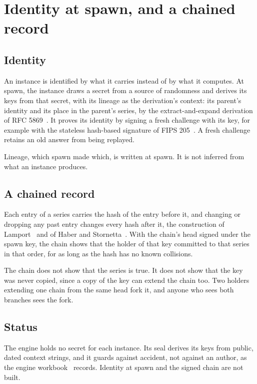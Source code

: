 \chapter{\texorpdfstring{Identity at spawn, and a chained record}{Identity at spawn, and a chained record}}
\label{chap:identity}

\section{\texorpdfstring{Identity}{Identity}}

An instance is identified by what it carries instead of by what it computes. At spawn, the instance draws a secret from a source of randomness and derives its keys from that secret, with its lineage as the derivation's context: its parent's identity and its place in the parent's series, by the extract-and-expand derivation of RFC 5869~\cite{src:RFC5869}. It proves its identity by signing a fresh challenge with its key, for example with the stateless hash-based signature of FIPS 205~\cite{src:FIPS-205}. A fresh challenge retains an old answer from being replayed.

Lineage, which spawn made which, is written at spawn. It is not inferred from what an instance produces.

\section{\texorpdfstring{A chained record}{A chained record}}

Each entry of a series carries the hash of the entry before it, and changing or dropping any past entry changes every hash after it, the construction of Lamport~\cite{src:Lamport-1981} and of Haber and Stornetta~\cite{src:Haber-Stornetta-1991}. With the chain's head signed under the spawn key, the chain shows that the holder of that key committed to that series in that order, for as long as the hash has no known collisions.

The chain does not show that the series is true. It does not show that the key was never copied, since a copy of the key can extend the chain too. Two holders extending one chain from the same head fork it, and anyone who sees both branches sees the fork.

\section{\texorpdfstring{Status}{Status}}

The engine holds no secret for each instance. Its seal derives its keys from public, dated context strings, and it guards against accident, not against an author, as the engine workbook~\cite{src:Quigg-engine-workbook} records. Identity at spawn and the signed chain are not built.
